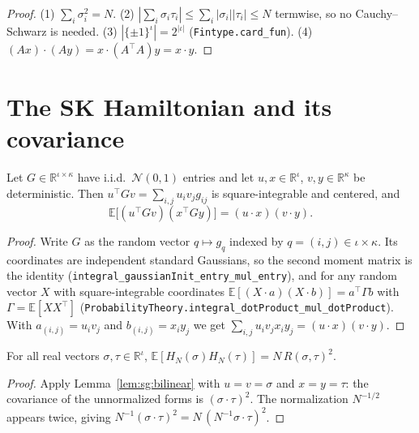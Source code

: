 \begin{proof}
  \leanok
(1) $\sum_i\sigma_i^2=N$. (2) $|\sum_i\sigma_i\tau_i|\le\sum_i|\sigma_i||\tau_i|\le N$ termwise, so no Cauchy--Schwarz
is needed. (3) $|\{\pm1\}^\iota|=2^{|\iota|}$ (\texttt{Fintype.card\_fun}). (4) $(Ax)\cdot(Ay)=x\cdot(A^\top A)y=x\cdot y$.
\end{proof}

\section{The SK Hamiltonian and its covariance}\label{sec:sg:sk}

\begin{lemma}\label{lem:sg:bilinear}
  \leanok
Let $G\in\mathbb R^{\iota\times\kappa}$ have i.i.d.\ $\mathcal N(0,1)$ entries and let $u,x\in\mathbb R^\iota$,
$v,y\in\mathbb R^\kappa$ be deterministic. Then $u^\top Gv=\sum_{i,j}u_iv_jg_{ij}$ is square-integrable and centered, and
\[\mathbb E\big[(u^\top Gv)(x^\top Gy)\big]=(u\cdot x)(v\cdot y).\]
\end{lemma}

\begin{proof}
  \leanok
Write $G$ as the random vector $q\mapsto g_q$ indexed by $q=(i,j)\in\iota\times\kappa$. Its coordinates are
independent standard Gaussians, so the second moment matrix is the identity
(\texttt{integral\_gaussianInit\_entry\_mul\_entry}), and for any random vector $X$ with square-integrable
coordinates $\mathbb E[(X\cdot a)(X\cdot b)]=a^\top\Gamma b$ with $\Gamma=\mathbb E[XX^\top]$
(\texttt{ProbabilityTheory.integral\_dotProduct\_mul\_dotProduct}). With $a_{(i,j)}=u_iv_j$ and
$b_{(i,j)}=x_iy_j$ we get $\sum_{i,j}u_iv_jx_iy_j=(u\cdot x)(v\cdot y)$.
\end{proof}

\begin{theorem}\label{thm:sg:skcov}
  \leanok
For all real vectors $\sigma,\tau\in\mathbb R^\iota$,
$\mathbb E[H_N(\sigma)H_N(\tau)]=N\,R(\sigma,\tau)^2$.
\end{theorem}

\begin{proof}
  \leanok
Apply Lemma~\ref{lem:sg:bilinear} with $u=v=\sigma$ and $x=y=\tau$: the covariance of the unnormalized forms is
$(\sigma\cdot\tau)^2$. The normalization $N^{-1/2}$ appears twice, giving
$N^{-1}(\sigma\cdot\tau)^2=N\,(N^{-1}\sigma\cdot\tau)^2$.
\end{proof}

